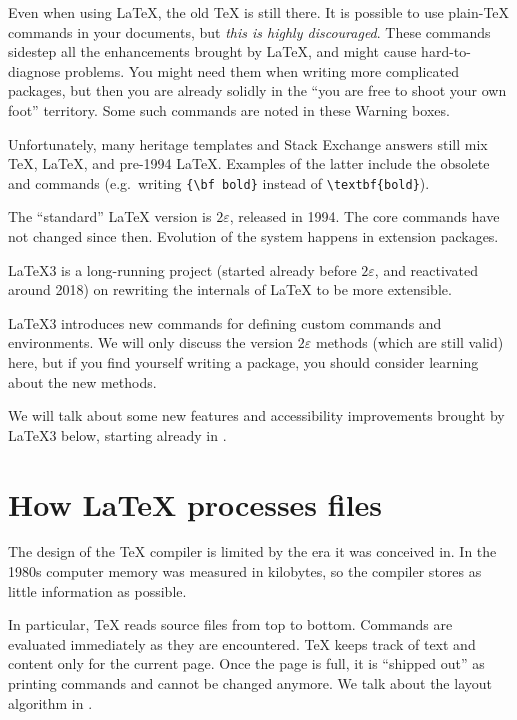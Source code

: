 \begin{warning}
Even when using \LaTeX{}, the old \TeX{} is still there.
It is possible to use plain-\TeX{} commands in your documents,
but \emph{this is highly discouraged}.
These commands sidestep all the enhancements brought by \LaTeX,
and might cause hard-to-diagnose problems.
You might need them when writing more complicated packages,
but then you are already solidly in the ``you are free to shoot your own foot'' territory.
Some such commands are noted in these Warning boxes.

Unfortunately, many heritage templates and Stack Exchange answers still mix
\TeX{}, \LaTeX, and pre-1994 \LaTeX.
Examples of the latter include the obsolete  and  commands
(e.g.\ writing \verb|{\bf bold}| instead of \verb|\textbf{bold}|).
\end{warning}


\begin{latexthree}
The ``standard'' \LaTeX{} version is $2\varepsilon$, released in 1994.
The core commands have not changed since then.
Evolution of the system happens in extension packages.

\LaTeX3 is a long-running project (started already before $2\varepsilon$, and reactivated around 2018)
on rewriting the internals of \LaTeX{} to be more extensible.

\LaTeX3 introduces new commands for defining custom commands and environments.
We will only discuss the version $2\varepsilon$ methods (which are still valid) here,
but if you find yourself writing a package, you should consider learning about the new methods.%
\footnotemark

We will talk about some new features and accessibility improvements brought by \LaTeX3 below,
starting already in .
\end{latexthree}



%
%
%
\section{How \LaTeX{} processes files}

The design of the \TeX{} compiler is limited by the era it was conceived in.
In the 1980s computer memory was measured in kilobytes,
so the compiler stores as little information as possible.

In particular, \TeX{} reads source files from top to bottom.
Commands are evaluated immediately as they are encountered.
\TeX{} keeps track of text and content only for the current page.
Once the page is full, it is ``shipped out'' as printing commands and cannot be changed anymore.
We talk about the layout algorithm in .

